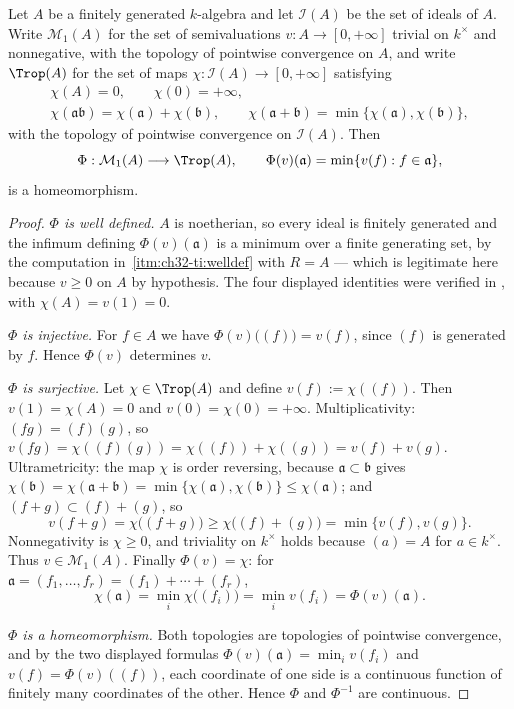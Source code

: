 \begin{theorem}
\label{thm:ch32-tropical-spectrum}
Let $A$ be a finitely generated $k$-algebra and let $\mathcal I(A)$ be
the set of ideals of $A$.  Write $\mathcal M_1(A)$ for the set of
semivaluations $v:A\to[0,+\infty]$ trivial on $k^\times$ and
nonnegative, with the topology of pointwise convergence on $A$, and write
$\Trop(A)$ for the set of maps $\chi:\mathcal I(A)\to[0,+\infty]$
satisfying
\[
\begin{gathered}
 \chi(A)=0,\qquad \chi(0)=+\infty,\\
 \chi(\mathfrak a\mathfrak b)=\chi(\mathfrak a)+\chi(\mathfrak b),\qquad
 \chi(\mathfrak a+\mathfrak b)=\min\{\chi(\mathfrak a),\chi(\mathfrak b)\},
\end{gathered}
\]
with the topology of pointwise convergence on $\mathcal I(A)$.  Then
\[
 \Phi:\mathcal M_1(A)\longrightarrow\Trop(A),
 \qquad
 \Phi(v)(\mathfrak a)=\min\{v(f):f\in\mathfrak a\},
\]
is a homeomorphism.
\end{theorem}

\begin{proof}
\emph{$\Phi$ is well defined.}  $A$ is noetherian, so every ideal is
finitely generated and the infimum defining $\Phi(v)(\mathfrak a)$ is a
minimum over a finite generating set, by the computation in
\,\cref{itm:ch32-ti:welldef} with
$R=A$ --- which is legitimate here because $v\geq0$ on $A$ by
hypothesis.  The four displayed identities were verified in
, with $\chi(A)=v(1)=0$.

\emph{$\Phi$ is injective.}  For $f\in A$ we have
$\Phi(v)\bigl((f)\bigr)=v(f)$, since $(f)$ is generated by $f$.  Hence
$\Phi(v)$ determines $v$.

\emph{$\Phi$ is surjective.}  Let $\chi\in\Trop(A)$ and define
$v(f):=\chi((f))$.  Then $v(1)=\chi(A)=0$ and $v(0)=\chi(0)=+\infty$.
Multiplicativity: $(fg)=(f)(g)$, so
$v(fg)=\chi((f)(g))=\chi((f))+\chi((g))=v(f)+v(g)$.  Ultrametricity: the
map $\chi$ is order reversing, because
$\mathfrak a\subset\mathfrak b$ gives
$\chi(\mathfrak b)=\chi(\mathfrak a+\mathfrak b)
 =\min\{\chi(\mathfrak a),\chi(\mathfrak b)\}\leq\chi(\mathfrak a)$; and
$(f+g)\subset(f)+(g)$, so
\[
 v(f+g)=\chi\bigl((f+g)\bigr)\geq\chi\bigl((f)+(g)\bigr)
 =\min\{v(f),v(g)\}.
\]
Nonnegativity is $\chi\geq0$, and triviality on $k^\times$ holds because
$(a)=A$ for $a\in k^\times$.  Thus $v\in\mathcal M_1(A)$.  Finally
$\Phi(v)=\chi$: for $\mathfrak a=(f_1,\ldots,f_r)=(f_1)+\cdots+(f_r)$,
\[
 \chi(\mathfrak a)=\min_i\chi\bigl((f_i)\bigr)=\min_iv(f_i)
 =\Phi(v)(\mathfrak a).
\]

\emph{$\Phi$ is a homeomorphism.}  Both topologies are topologies of
pointwise convergence, and by the two displayed formulas
$\Phi(v)(\mathfrak a)=\min_iv(f_i)$ and $v(f)=\Phi(v)((f))$, each
coordinate of one side is a continuous function of finitely many coordinates
of the other.  Hence $\Phi$ and $\Phi^{-1}$ are continuous.
\end{proof}

